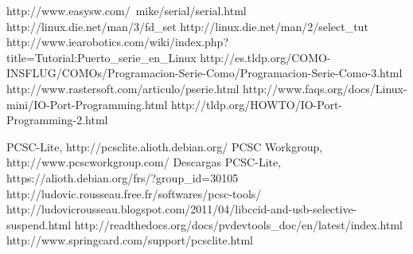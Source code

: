 \begin{thebibliography}{200}
\bibitem{} http://www.easysw.com/~mike/serial/serial.html
\bibitem{} http://linux.die.net/man/3/fd\_set
\bibitem{} http://linux.die.net/man/2/select\_tut
\bibitem{} http://www.iearobotics.com/wiki/index.php?title=Tutorial:Puerto\_serie\_en\_Linux
\bibitem{} http://es.tldp.org/COMO-INSFLUG/COMOs/Programacion-Serie-Como/Programacion-Serie-Como-3.html
\bibitem{} http://www.rastersoft.com/articulo/pserie.html
\bibitem{} http://www.faqs.org/docs/Linux-mini/IO-Port-Programming.html
\bibitem{} http://tldp.org/HOWTO/IO-Port-Programming-2.html

 PCSC-Lite, http://pcsclite.alioth.debian.org/
 PCSC Workgroup, http://www.pcscworkgroup.com/
 Descargas PCSC-Lite, https://alioth.debian.org/frs/?group\_id=30105
 http://ludovic.rousseau.free.fr/softwares/pcsc-tools/
\bibitem{} http://ludovicrousseau.blogspot.com/2011/04/libccid-and-usb-selective-suspend.html
\bibitem{} http://readthedocs.org/docs/pvdevtools\_doc/en/latest/index.html
\bibitem{} http://www.springcard.com/support/pcsclite.html

\end{thebibliography}
